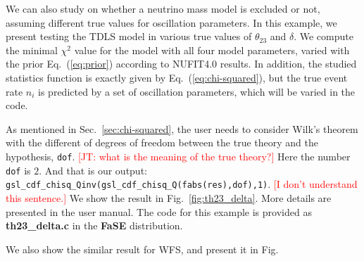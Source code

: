\documentclass[aps,prd,nofootinbib,preprint]{revtex4}
\begin{document}
We can also study on whether a neutrino mass model is excluded or not, assuming different true values for oscillation parameters. In this example, we present testing the TDLS model in various true values of $\theta_{23}$ and $\delta$. We compute the minimal $\chi^2$ value for the model with all four model parameters, varied with the prior Eq.~(\ref{eq:prior}) according to NUFIT4.0 results. In addition, the studied statistics function is exactly given by Eq.~(\ref{eq:chi-squared}), but the true event rate $n_i$ is predicted by a set of oscillation parameters, which will be varied in the code. 

As mentioned in Sec.~\ref{sec:chi-squared}, the user needs to consider Wilk's theorem with the different of degrees of freedom between the true theory and the hypothesis, \texttt{dof}. \textcolor{red}{[JT: what is the meaning of the true theory?]} Here the number \texttt{dof} is $2$. And that is our output: \texttt{gsl\_cdf\_chisq\_Qinv(gsl\_cdf\_chisq\_Q(fabs(res),dof),1)}. \textcolor{red}{[I don't understand this sentence.]} We show the result in Fig.~\ref{fig:th23_delta}. More details are presented in the user manual. The code for this example is provided as 
\textbf{th23\_delta.c} in the \textbf{FaSE} distribution.

{\color{red}We also show the similar result for WFS, and present it in Fig.}


%
\end{document}
